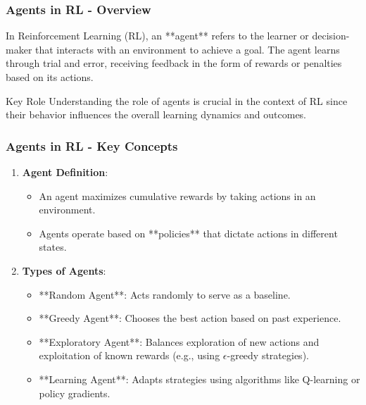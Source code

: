 \documentclass{beamer}
\begin{document}
\begin{frame}[fragile]
    \frametitle{Agents in RL - Overview}
    In Reinforcement Learning (RL), an **agent** refers to the learner or decision-maker that interacts with an environment to achieve a goal. The agent learns through trial and error, receiving feedback in the form of rewards or penalties based on its actions. 
    \begin{block}{Key Role}
        Understanding the role of agents is crucial in the context of RL since their behavior influences the overall learning dynamics and outcomes.
    \end{block}
\end{frame}

\begin{frame}[fragile]
    \frametitle{Agents in RL - Key Concepts}
    \begin{enumerate}
        \item \textbf{Agent Definition}:
        \begin{itemize}
            \item An agent maximizes cumulative rewards by taking actions in an environment.
            \item Agents operate based on **policies** that dictate actions in different states.
        \end{itemize}
        
        \item \textbf{Types of Agents}:
        \begin{itemize}
            \item **Random Agent**: Acts randomly to serve as a baseline.
            \item **Greedy Agent**: Chooses the best action based on past experience.
            \item **Exploratory Agent**: Balances exploration of new actions and exploitation of known rewards (e.g., using $\epsilon$-greedy strategies).
            \item **Learning Agent**: Adapts strategies using algorithms like Q-learning or policy gradients.
        \end{itemize}
    \end{enumerate}
\end{frame}
\end{document}
